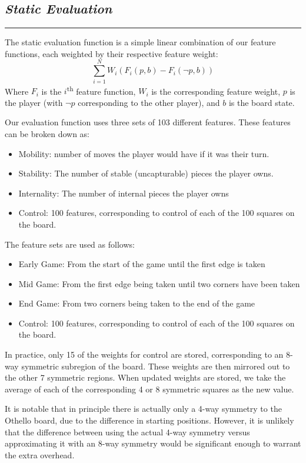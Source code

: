 \documentclass[10pt]{report}
\begin{document}
\begin{multicols}{2}
\section*{\emph{Static Evaluation}}
\hrule
The static evaluation function is a simple linear combination of our feature functions, each weighted by their respective feature weight:
\[
	\sum_{i=1}^N W_i \left(F_i(p,b) -F_i(\neg p,b) \right)
\]
Where $F_i$ is the $i$\textsuperscript{th} feature function, $W_i$ is the corresponding feature weight, $p$ is the player (with $\neg p$ corresponding to the other player), and $b$ is the board state.

Our evaluation function uses three sets of 103 different features. These features can be broken down as:
    \begin{itemize}
  \item
    Mobility: number of moves the player would have if it was their turn.
  \item
   Stability:  The number of stable (uncapturable) pieces the player owns.
  \item
   Internality: The number of internal pieces the player owns
  \item
    Control: 100 features, corresponding to control of each of the 100 squares on the board.
  \end{itemize}

The feature sets are used as follows:
    \begin{itemize}
  \item
    Early Game: From the start of the game until the first edge is taken
  \item
   Mid Game: From the first edge being taken until two corners have been taken
  \item
   End Game: From two corners being taken to the end of the game
  \item
    Control: 100 features, corresponding to control of each of the 100 squares on the board.
  \end{itemize}

In practice, only 15 of the weights for control are stored, corresponding to an 8-way symmetric subregion of the board. These weights are then mirrored out to the other 7 symmetric regions. When updated weights are stored, we take the average of each of the corresponding 4 or 8 symmetric squares as the new value.

\newpage
It is notable that in principle there is actually only a 4-way symmetry to the Othello board, due to the difference in starting positions. However, it is unlikely that the difference between using the actual 4-way symmetry versus approximating it with an 8-way symmetry would be significant enough to warrant the extra overhead.


\end{multicols}
\end{document}
